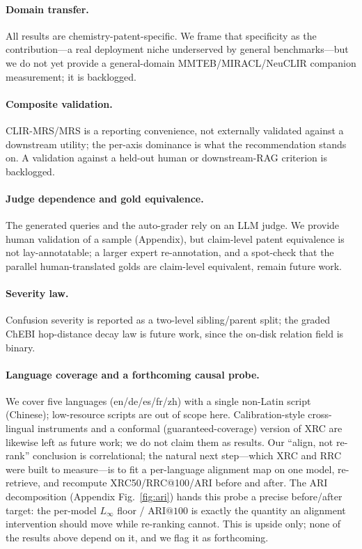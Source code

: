 \documentclass[11pt]{article}
\begin{document}
\paragraph{Domain transfer.}
All results are chemistry-patent-specific. We frame that specificity as the
contribution---a real deployment niche underserved by general benchmarks---but
we do not yet provide a general-domain MMTEB/MIRACL/NeuCLIR companion
measurement; it is backlogged.

\paragraph{Composite validation.}
CLIR-MRS/MRS is a reporting convenience, not externally validated against a
downstream utility; the per-axis dominance is what the recommendation stands on.
A validation against a held-out human or downstream-RAG criterion is backlogged.

\paragraph{Judge dependence and gold equivalence.}
The generated queries and the auto-grader rely on an LLM judge. We provide human
validation of a sample (Appendix), but claim-level patent equivalence is not
lay-annotatable; a larger expert re-annotation, and a spot-check that the
parallel human-translated golds are claim-level equivalent, remain future work.

\paragraph{Severity law.}
Confusion severity is reported as a two-level sibling/parent split; the graded
ChEBI hop-distance decay law is future work, since the on-disk relation field is
binary.

\paragraph{Language coverage and a forthcoming causal probe.}
We cover five languages (en/de/es/fr/zh) with a single non-Latin script
(Chinese); low-resource scripts are out of scope here. Calibration-style
cross-lingual instruments and a conformal (guaranteed-coverage) version of XRC
are likewise left as future work; we do not claim them as results. Our
``align, not re-rank'' conclusion is correlational; the natural next step---which
XRC and RRC were built to measure---is to fit a per-language alignment map on one
model, re-retrieve, and recompute XRC50/RRC@100/ARI before and after. The ARI
decomposition (Appendix Fig.~\ref{fig:ari}) hands this probe a precise before/after
target: the per-model $L_\infty$ floor / $\mathrm{ARI@}100$ is exactly the
quantity an alignment intervention should move while re-ranking cannot. This is
upside only; none of the results above depend on it, and we flag it as
forthcoming.
\end{document}
